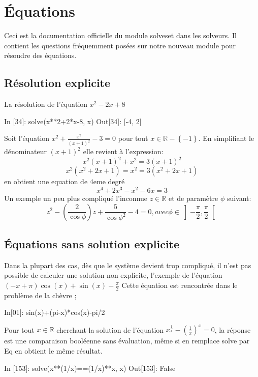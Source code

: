 \section{Équations}
Ceci est la documentation officielle du module solveset dans les solveurs. Il contient les questions fréquemment posées sur notre nouveau module pour résoudre des équations.
 \subsection{Résolution explicite}
 La résolution de l’équation $x^{2}-2x+8$
 \begin{python}
In [34]: solve(x**2+2*x-8, x)                                                                     
Out[34]: [-4, 2]
\end{python}
Soit l'équation $x^{2} + \frac{x^{2}}{(x+1)^{2}} - 3 = 0$ pour tout $x \in \mathbb{R}-\left\lbrace -1 \right\rbrace $. En simplifiant le dénominateur $(x+1)^{2}$ elle revient à l'expression:
\[
x^{2}(x+1)^{2} + x^{2} = 3(x+1)^{2}
\]
\[
x^{2}\left(x^{2}+2x+1\right)=x^{2} = 3\left(x^{2}+2x+1\right)
\]
en obtient une equation de 4eme degré
\[
x^{4}+2x^{3}-{x}^{2}-6x = 3
\]
Un exemple un peu plus compliqué l'inconnue $z \in \mathbb{R}$  et de paramètre  $\phi$ suivant:
\[
 z^{2} - (\frac{2}{\cos\phi})z + \frac{5}{\cos\phi^{2}}-4 = 0, avec \phi \in \left]-\frac{\pi}{2}, \frac{\pi}{2}\right[ 
\]
\begin{python}

\end{python}
 \subsection{Équations sans solution explicite}
Dans la plupart des cas, dès que le système devient trop compliqué, il n’est pas possible de calculer une 
solution non explicite, l'exemple de l’équation $\left(- x + \pi\right) \cos{\left (x \right )} + \sin{\left (x 
\right )} - \frac{\pi}{2}$ Cette équation est rencontrée dans le problème de la chèvre ;
\begin{python}
In[01]: sin(x)+(pi-x)*cos(x)-pi/2
\end{python}
Pour tout $x \in \mathbb{R}$ cherchant la solution de l’équation $x^{\frac{1}{x}} - (\frac{1}{x})^{x}=0$, la 
réponse est une comparaison booléenne sans évaluation, même si en remplace solve par Eq en obtient le même 
résultat.  
\begin{python}
In [153]: solve(x**(1/x)==(1/x)**x, x)
Out[153]: False
\end{python}
